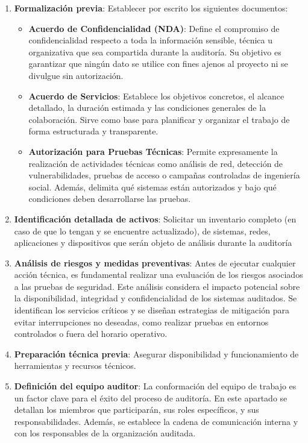 \documentclass[a4paper, 10pt]{article}
\begin{document}
\begin{enumerate}
\item \textbf{Formalización previa}: Establecer por escrito los siguientes documentos:

\begin{itemize}
\item \textbf{Acuerdo de Confidencialidad (NDA)}: Define el compromiso de confidencialidad respecto a toda la información sensible, técnica u organizativa que sea compartida durante la auditoría. Su objetivo es garantizar que ningún dato se utilice con fines ajenos al proyecto ni se divulgue sin autorización.

\item \textbf{Acuerdo de Servicios}: Establece los objetivos concretos, el alcance detallado, la duración estimada y las condiciones generales de la colaboración. Sirve como base para planificar y organizar el trabajo de forma estructurada y transparente.

\item \textbf{Autorización para Pruebas Técnicas}: Permite expresamente la realización de actividades técnicas como análisis de red, detección de vulnerabilidades, pruebas de acceso o campañas controladas de ingeniería social. Además, delimita qué sistemas están autorizados y bajo qué condiciones deben desarrollarse las pruebas.

\end{itemize}

\item \textbf{Identificación detallada de activos}: Solicitar un inventario completo (en caso de que lo tengan y se encuentre actualizado), de sistemas, redes, aplicaciones y dispositivos que serán objeto de análisis durante la auditoría
\item \textbf{Análisis de riesgos y medidas preventivas}: Antes de ejecutar cualquier acción técnica, es fundamental realizar una evaluación de los riesgos asociados a las pruebas de seguridad. Este análisis considera el impacto potencial sobre la disponibilidad, integridad y confidencialidad de los sistemas auditados. Se identifican los servicios críticos y se diseñan estrategias de mitigación para evitar interrupciones no deseadas, como realizar pruebas en entornos controlados o fuera del horario operativo.

\item \textbf{Preparación técnica previa}: Asegurar disponibilidad y funcionamiento de herramientas y recursos técnicos.
\item \textbf{Definición del equipo auditor}: La conformación del equipo de trabajo es un factor clave para el éxito del proceso de auditoría. En este apartado se detallan los miembros que participarán, sus roles específicos, y sus responsabilidades. Además, se establece la cadena de comunicación interna y con los responsables de la organización auditada.
\end{enumerate}
\end{document}

